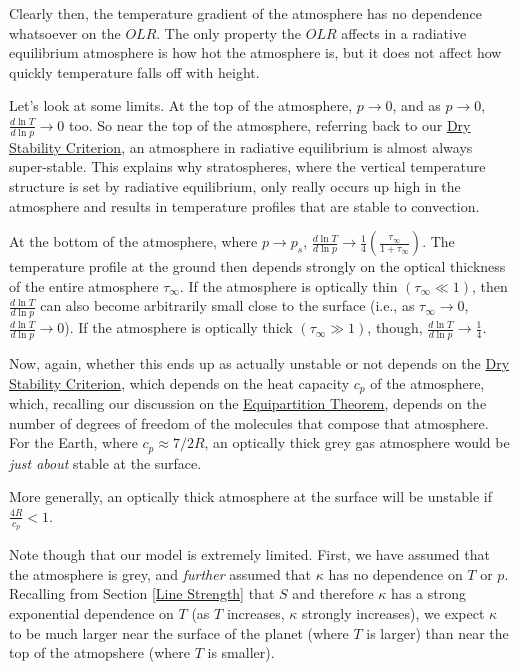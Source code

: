Clearly then, the temperature gradient of the atmosphere has no dependence whatsoever on the $OLR$. The only property the $OLR$ affects in a radiative equilibrium atmosphere is how hot the atmosphere is, but it does not affect how quickly temperature falls off with height.

Let's look at some limits. At the top of the atmosphere, $p\to 0$, and as $p\to 0$, $\frac{d\ln T}{d\ln p}\to 0$ too. So near the top of the atmosphere, referring back to our \hyperref[Dry Stability Box]{Dry Stability Criterion}, an atmosphere in radiative equilibrium is almost always super-stable. This explains why stratospheres, where the vertical temperature structure is set by radiative equilibrium, only really occurs up high in the atmosphere and results in temperature profiles that are stable to convection.

At the bottom of the atmosphere, where $p\to p_s$, $\frac{d\ln T}{d\ln p}\to \frac{1}{4}\left( \frac{\tau_\infty}{1+\tau_\infty} \right)$. The temperature profile at the ground then depends strongly on the optical thickness of the entire atmosphere $\tau_\infty$. If the atmosphere is optically thin $\left( \tau_\infty \ll 1 \right)$, then $\frac{d\ln T}{d\ln p}$ can also become arbitrarily small close to the surface (i.e., as $\tau_\infty \to 0$,$ \frac{d\ln T}{d\ln p} \to 0$). If the atmosphere is optically thick $\left( \tau_\infty \gg 1 \right)$, though, $\frac{d\ln T}{d\ln p} \to \frac{1}{4}$.

Now, again, whether this ends up as actually unstable or not depends on the \hyperref[Dry Stability Box]{Dry Stability Criterion}, which depends on the heat capacity $c_p$ of the atmosphere, which, recalling our discussion on the \hyperref[Equipartition]{Equipartition Theorem}, depends on the number of degrees of freedom of the molecules that compose that atmosphere. For the Earth, where $c_p\approx 7/2 R$, an optically thick grey gas atmosphere would be \textit{just about} stable at the surface.

More generally, an optically thick atmosphere at the surface will be unstable if $\frac{4R}{c_p}<1$.

Note though that our model is extremely limited. First, we have assumed that the atmosphere is grey, and \textit{further} assumed that $\kappa$ has no dependence on $T$ or $p$. Recalling from Section \ref{Line Strength} that $S$ and therefore $\kappa$ has a strong exponential dependence on $T$ (as $T$ increases, $\kappa$ strongly increases), we expect $\kappa$ to be much larger near the surface of the planet (where $T$ is larger) than near the top of the atmopshere (where $T$ is smaller).

